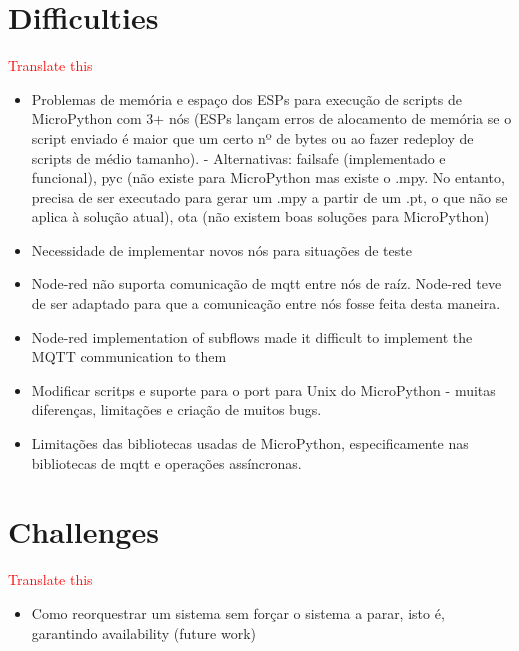 \section{Difficulties}\label{sec:difficulties}

\textcolor{red}{Translate this}

\begin{itemize}
    \item Problemas de memória e espaço dos ESPs para execução de scripts de MicroPython com 3+ nós (ESPs lançam erros de alocamento de memória se o script enviado é maior que um certo nº de bytes ou ao fazer redeploy de scripts de médio tamanho). - Alternativas: failsafe (implementado e funcional), pyc (não existe para MicroPython mas existe o .mpy. No entanto, precisa de ser executado para gerar um .mpy a partir de um .pt, o que não se aplica à solução atual), ota (não existem boas soluções para MicroPython)
    \item Necessidade de implementar novos nós para situações de teste
    \item Node-red não suporta comunicação de mqtt entre nós de raíz. Node-red teve de ser adaptado para que a comunicação entre nós fosse feita desta maneira.
    \item Node-red implementation of subflows made it difficult to implement the MQTT communication to them
    \item Modificar scritps e suporte para o port para Unix do MicroPython - muitas diferenças, limitações e criação de muitos bugs.
    \item Limitações das bibliotecas usadas de MicroPython, especificamente nas bibliotecas de mqtt e operações assíncronas.
\end{itemize}{}

\section{Challenges}\label{sec:challenges}
\textcolor{red}{Translate this}
\begin{itemize}
    \item Como reorquestrar um sistema sem forçar o sistema a parar, isto é, garantindo availability (future work)
\end{itemize}

